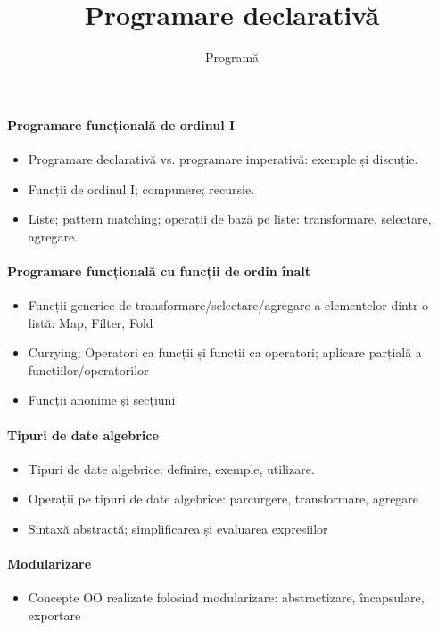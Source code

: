 \documentclass[romanian]{article}
\title{\vspace{-10ex}Programare declarativă}
\author{Programă}
\begin{document}
\maketitle
\thispagestyle{empty}

\vfill
\paragraph{Programare funcțională de ordinul I}
\begin{itemize}
\item Programare declarativă vs. programare imperativă: exemple și discuție.
\item Funcții de ordinul I; compunere; recursie.
\item Liste; pattern matching; operații de bază pe liste: transformare, selectare, agregare.
\end{itemize}
\paragraph{Programare funcțională cu funcții de ordin înalt}
\begin{itemize}
\item Funcții generice de transformare/selectare/agregare a elementelor dintr-o listă: Map, Filter, Fold
\item Currying; Operatori ca funcții și funcții ca operatori; aplicare parțială a funcțiilor/operatorilor
\item Funcții anonime și secțiuni
\end{itemize}
\paragraph{Tipuri de date algebrice}
\begin{itemize}
\item Tipuri de date algebrice: definire, exemple, utilizare.
\item Operații pe tipuri de date algebrice: parcurgere, transformare, agregare
\item Sintaxă abstractă; simplificarea și evaluarea expresiilor
\end{itemize}
\paragraph{Modularizare}
\begin{itemize}
\item Concepte OO realizate folosind modularizare: abstractizare, încapsulare, exportare
\end{itemize}
\end{document}
